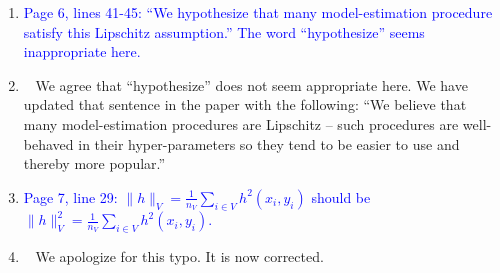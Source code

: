 \documentclass[]{article}
\newcommand{\point}[1]{\item \textcolor{blue}{#1}}
\newcommand{\reply}{\item[]\ }
\begin{document}
\begin{enumerate}
		\point{
		Page 6, lines 41-45: “We hypothesize that many model-estimation procedure satisfy this Lipschitz assumption.” The word “hypothesize” seems inappropriate here.
		}

		\reply{
			We agree that ``hypothesize'' does not seem appropriate here.
			We have updated that sentence in the paper with the following: ``We believe that many model-estimation procedures are Lipschitz – such procedures are well-behaved in their hyper-parameters so they tend to be easier to use and thereby more popular.''
		}
	
		\point{
			Page 7, line 29: $\|h\|_V = \frac{1}{n_V} \sum_{i \in V} h^2(x_i, y_i)$ should be $\|h\|_V^2 = \frac{1}{n_V} \sum_{i \in V} h^2(x_i, y_i).$
		}
	
		\reply{
			We apologize for this typo. It is now corrected.
		}
	
		\end{enumerate} 
	
\end{document}
